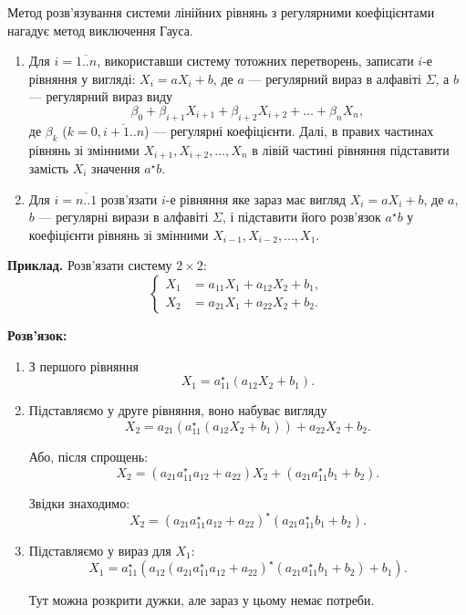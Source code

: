 Метод розв'язування системи лінійних рівнянь з регулярними коефіцієнтами нагадує метод виключення Гауса.
\begin{enumerate}
	\item Для $i = \overline{1..n}$, використавши систему тотожних перетворень, записати  $i$-е рівняння у вигляді: $X_i = a X_i + b$, де $a$ --- регулярний вираз в алфавіті $\Sigma$, а $b$ --- регулярний вираз виду \[\beta_0 + \beta_{i+1} X_{i+1} + \beta_{i+2} X_{i+2} + \ldots + \beta_n X_n,\]	де $\beta_k$ ($k = 0, \overline{i+1..n}$) --- регулярні коефіцієнти. Далі, в правих частинах рівнянь зі змінними $X_{i+1}, X_{i+2}, \ldots, X_n$ в лівій частині рівняння підставити замість $X_i$ значення $a^\star b$.

	\item Для $i = \overline{n..1}$ розв'язати $i$-е рівняння яке зараз має вигляд $X_i = a X_i + b$, де $a$, $b$ --- регулярні вирази в алфавіті $\Sigma$, і підставити його розв'язок $a^\star b$	у коефіцієнти рівнянь зі змінними $X_{i-1}, X_{i-2}, \ldots, X_1$.
\end{enumerate}

\textbf{Приклад.} Розв'язати систему $2\times2$:
\[
\left\{
\begin{aligned}
X_1 &= a_{11} X_1 + a_{12} X_2 + b_1, \\
X_2 &= a_{21} X_1 + a_{22} X_2 + b_2.
\end{aligned}
\right.
\]

\textbf{Розв'язок:}
\begin{enumerate}
	\item З першого рівняння \[X_1 = a_{11}^\star (a_{12} X_2 + b_1).\]

	\item Підставляємо у друге рівняння, воно набуває вигляду\[X_2 = a_{21} (a_{11}^\star (a_{12} X_2 + b_1)) + a_{22} X_2 + b_2.\]

	Або, після спрощень:\[X_2 = (a_{21} a_{11}^\star a_{12} + a_{22}) X_2 + (a_{21} a_{11}^\star b_1 + b_2).\]

	Звідки знаходимо:\[X_2 = (a_{21} a_{11}^\star a_{12} + a_{22})^\star (a_{21} a_{11}^\star b_1 + b_2).\]

	\item Підставляємо у вираз для $X_1$:\[
	X_1 = a_{11}^\star (a_{12} (a_{21} a_{11}^\star a_{12} + a_{22})^\star (a_{21} a_{11}^\star b_1 + b_2) + b_1).\]

	Тут можна розкрити дужки, але зараз у цьому немає потреби.
\end{enumerate}

